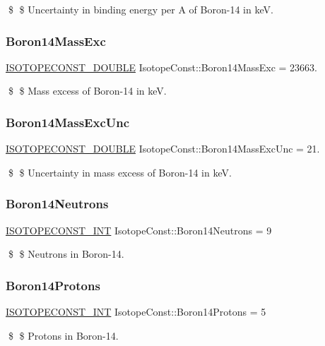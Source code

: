 \$ \$ Uncertainty in binding energy per A of Boron-\/14 in keV. \mbox{\label{group___isotope_const-_boron-_b14_gaa12538ab60bb0b88a250763ffe003e69}} 
\subsubsection{\texorpdfstring{Boron14\+Mass\+Exc}{Boron14MassExc}}
{\footnotesize\ttfamily \mbox{\hyperlink{group___isotope_const-_macros_ga8f45a7272ce02c0b4c65c44636ed719a}{I\+S\+O\+T\+O\+P\+E\+C\+O\+N\+S\+T\+\_\+\+D\+O\+U\+B\+LE}} Isotope\+Const\+::\+Boron14\+Mass\+Exc = 23663.}

\$ \$ Mass excess of Boron-\/14 in keV. \mbox{\label{group___isotope_const-_boron-_b14_ga0b206ebcf6980e956f619ae13c1a0863}} 
\subsubsection{\texorpdfstring{Boron14\+Mass\+Exc\+Unc}{Boron14MassExcUnc}}
{\footnotesize\ttfamily \mbox{\hyperlink{group___isotope_const-_macros_ga8f45a7272ce02c0b4c65c44636ed719a}{I\+S\+O\+T\+O\+P\+E\+C\+O\+N\+S\+T\+\_\+\+D\+O\+U\+B\+LE}} Isotope\+Const\+::\+Boron14\+Mass\+Exc\+Unc = 21.}

\$ \$ Uncertainty in mass excess of Boron-\/14 in keV. \mbox{\label{group___isotope_const-_boron-_b14_gaf673ce21aa743fba080eeb5b94a2ddc4}} 
\subsubsection{\texorpdfstring{Boron14\+Neutrons}{Boron14Neutrons}}
{\footnotesize\ttfamily \mbox{\hyperlink{group___isotope_const-_macros_ga5f18360b3e99483a35c32d789e62621c}{I\+S\+O\+T\+O\+P\+E\+C\+O\+N\+S\+T\+\_\+\+I\+NT}} Isotope\+Const\+::\+Boron14\+Neutrons = 9}

\$ \$ Neutrons in Boron-\/14. \mbox{\label{group___isotope_const-_boron-_b14_ga3f0a36fd788e21b7d3c7d70cbc8a18cb}} 
\subsubsection{\texorpdfstring{Boron14\+Protons}{Boron14Protons}}
{\footnotesize\ttfamily \mbox{\hyperlink{group___isotope_const-_macros_ga5f18360b3e99483a35c32d789e62621c}{I\+S\+O\+T\+O\+P\+E\+C\+O\+N\+S\+T\+\_\+\+I\+NT}} Isotope\+Const\+::\+Boron14\+Protons = 5}

\$ \$ Protons in Boron-\/14. 